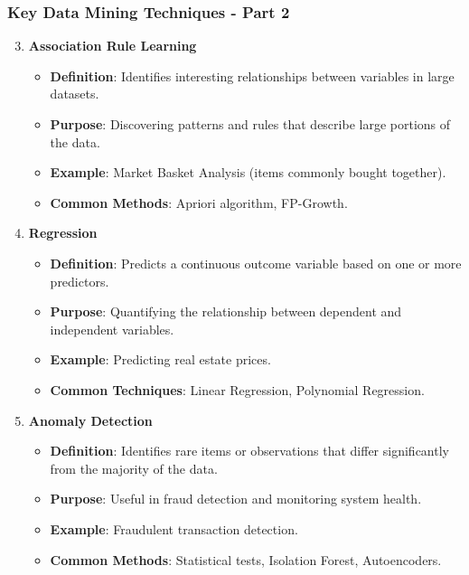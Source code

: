 \documentclass[aspectratio=169]{beamer}
\begin{document}
\begin{frame}[fragile]
    \frametitle{Key Data Mining Techniques - Part 2}
    \begin{enumerate}
        \setcounter{enumi}{2}
        \item \textbf{Association Rule Learning}
        \begin{itemize}
            \item \textbf{Definition}: Identifies interesting relationships between variables in large datasets.
            \item \textbf{Purpose}: Discovering patterns and rules that describe large portions of the data.
            \item \textbf{Example}: Market Basket Analysis (items commonly bought together).
            \item \textbf{Common Methods}: Apriori algorithm, FP-Growth.
        \end{itemize}

        \item \textbf{Regression}
        \begin{itemize}
            \item \textbf{Definition}: Predicts a continuous outcome variable based on one or more predictors.
            \item \textbf{Purpose}: Quantifying the relationship between dependent and independent variables.
            \item \textbf{Example}: Predicting real estate prices.
            \item \textbf{Common Techniques}: Linear Regression, Polynomial Regression.
        \end{itemize}

        \item \textbf{Anomaly Detection}
        \begin{itemize}
            \item \textbf{Definition}: Identifies rare items or observations that differ significantly from the majority of the data.
            \item \textbf{Purpose}: Useful in fraud detection and monitoring system health.
            \item \textbf{Example}: Fraudulent transaction detection.
            \item \textbf{Common Methods}: Statistical tests, Isolation Forest, Autoencoders.
        \end{itemize}
    \end{enumerate}
\end{frame}
\end{document}
